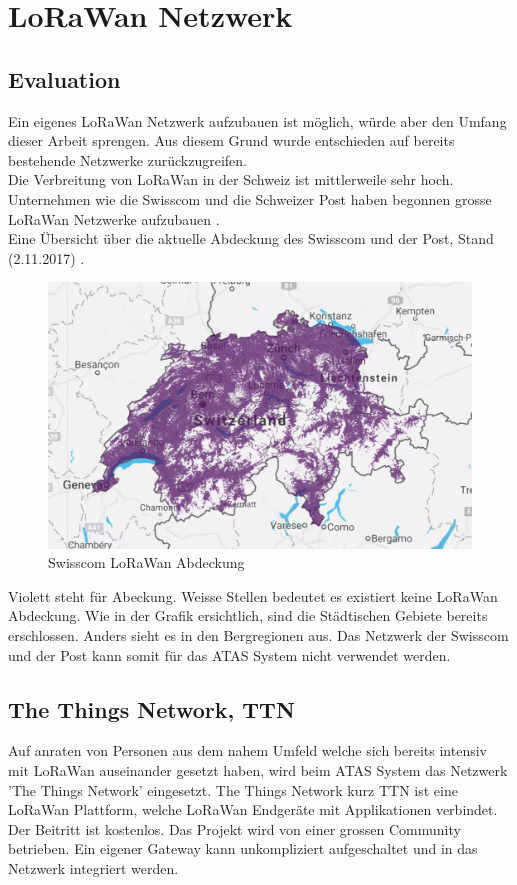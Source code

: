 \documentclass[11pt,english,german]{report}
\theoremstyle{definition}
\begin{document}
\newpage
\section{LoRaWan Netzwerk}
\subsection{Evaluation}
Ein eigenes LoRaWan Netzwerk aufzubauen ist möglich, würde aber den Umfang dieser Arbeit sprengen. Aus diesem Grund wurde entschieden auf bereits bestehende Netzwerke zurückzugreifen.\\[0.3cm]
Die Verbreitung von LoRaWan in der Schweiz ist mittlerweile sehr hoch. Unternehmen wie die Swisscom und die Schweizer Post haben begonnen grosse LoRaWan Netzwerke aufzubauen \cite{swisscompost}.\\[0.3cm]
Eine Übersicht über die aktuelle Abdeckung des Swisscom und der Post, Stand (2.11.2017)  \cite{swisscomcoverage}.
\begin{figure}[H]
	\centering
	\includegraphics[width=\textwidth]{img/lora/swisscomlorawan.jpg}
	\caption[Swisscom LoRaWan Abdeckung]
	{Swisscom LoRaWan Abdeckung}
\end{figure}
\noindent
Violett steht für Abeckung. Weisse Stellen bedeutet es existiert keine LoRaWan Abdeckung. Wie in der Grafik ersichtlich, sind die Städtischen Gebiete bereits erschlossen. Anders sieht es in den Bergregionen aus. Das Netzwerk der Swisscom und der Post kann somit für das ATAS System nicht verwendet werden.\

\newpage
\subsection{The Things Network, TTN}
Auf anraten von Personen aus dem nahem Umfeld welche sich bereits intensiv mit LoRaWan auseinander gesetzt haben, wird beim ATAS System das Netzwerk 'The Things Network' eingesetzt. The Things Network kurz TTN ist eine LoRaWan Plattform, welche LoRaWan Endgeräte mit Applikationen verbindet. Der Beitritt ist kostenlos. Das Projekt wird von einer grossen Community betrieben. Ein eigener Gateway kann unkompliziert aufgeschaltet und in das Netzwerk integriert werden. 
\end{document}
